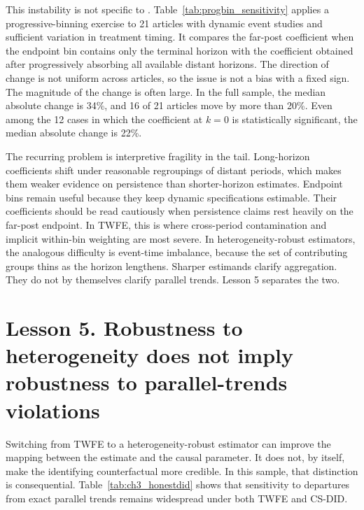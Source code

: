 This instability is not specific to \textcite{lawler2023effect}. Table~\ref{tab:progbin_sensitivity} applies a progressive-binning exercise to 21 articles with dynamic event studies and sufficient variation in treatment timing. It compares the far-post coefficient when the endpoint bin contains only the terminal horizon with the coefficient obtained after progressively absorbing all available distant horizons. The direction of change is not uniform across articles, so the issue is not a bias with a fixed sign. The magnitude of the change is often large. In the full sample, the median absolute change is 34\%, and 16 of 21 articles move by more than 20\%. Even among the 12 cases in which the coefficient at $k=0$ is statistically significant, the median absolute change is 22\%.

The recurring problem is interpretive fragility in the tail. Long-horizon coefficients shift under reasonable regroupings of distant periods, which makes them weaker evidence on persistence than shorter-horizon estimates. Endpoint bins remain useful because they keep dynamic specifications estimable. Their coefficients should be read cautiously when persistence claims rest heavily on the far-post endpoint. In TWFE, this is where cross-period contamination and implicit within-bin weighting are most severe. In heterogeneity-robust estimators, the analogous difficulty is event-time imbalance, because the set of contributing groups thins as the horizon lengthens. Sharper estimands clarify aggregation. They do not by themselves clarify parallel trends. Lesson 5 separates the two.





\newpage
\section{Lesson 5. Robustness to heterogeneity does not imply robustness to parallel-trends violations}

Switching from TWFE to a heterogeneity-robust estimator can improve the mapping between the estimate and the causal parameter. It does not, by itself, make the identifying counterfactual more credible. In this sample, that distinction is consequential. Table~\ref{tab:ch3_honestdid} shows that sensitivity to departures from exact parallel trends remains widespread under both TWFE and CS-DID.


